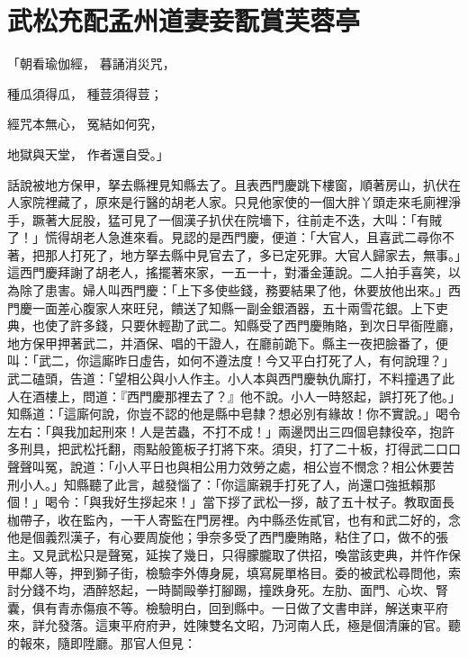 %

\chapter{武松充配孟州道\KG 妻妾翫賞芙蓉亭}

「朝看瑜伽經，  暮誦消災咒，

種瓜須得瓜，  種荳須得荳；

經咒本無心，  冤結如何究，

地獄與天堂，  作者還自受。」

話說被地方保甲，拏去縣裡見知縣去了。且表西門慶跳下樓窗，順著房山，扒伏在人家院裡藏了，原來是行醫的胡老人家。只見他家使的一個大胖丫頭走來毛廁裡淨手，蹶著大屁股，猛可見了一個漢子扒伏在院墻下，往前走不迭，大叫：「有賊了！」慌得胡老人急進來看。見認的是西門慶，便道：「大官人，且喜武二尋你不著，把那人打死了，地方拏去縣中見官去了，多已定死罪。大官人歸家去，無事。」這西門慶拜謝了胡老人，搖擺著來家，一五一十，對潘金蓮說。二人拍手喜笑，以為除了患害。婦人叫西門慶：「上下多使些錢，務要結果了他，休要放他出來。」西門慶一面差心腹家人來旺兒，饋送了知縣一副金銀酒器，五十兩雪花銀。上下吏典，也使了許多錢，只要休輕勘了武二。知縣受了西門慶賄賂，到次日早衙陞廳，地方保甲押著武二，并酒保、唱的干證人，在廳前跪下。縣主一夜把臉番了，便叫：「武二，你這廝昨日虛告，如何不遵法度！今又平白打死了人，有何說理？」武二磕頭，告道：「望相公與小人作主。小人本與西門慶執仇廝打，不料撞遇了此人在酒樓上，問道：『西門慶那裡去了？』他不說。小人一時怒起，誤打死了他。」知縣道：「這廝何說，你豈不認的他是縣中皂隸？想必別有緣故！你不實說。」喝令左右：「與我加起刑來！人是苦蟲，不打不成！」兩邊閃出三四個皂隸役卒，抱許多刑具，把武松托翻，雨點般篦板子打將下來。須臾，打了二十板，打得武二口口聲聲叫冤，說道：「小人平日也與相公用力效勞之處，相公豈不憫念？相公休要苦刑小人。」知縣聽了此言，越發惱了：「你這廝親手打死了人，尚還口強抵賴那個！」喝令：「與我好生拶起來！」當下拶了武松一拶，敲了五十杖子。教取面長枷帶子，收在監內，一干人寄監在門房裡。內中縣丞佐貳官，也有和武二好的，念他是個義烈漢子，有心要周旋他；爭奈多受了西門慶賄賂，粘住了口，做不的張主。又見武松只是聲冤，延挨了幾日，只得朦朧取了供招，喚當該吏典，并忤作保甲鄰人等，押到獅子街，檢驗李外傳身屍，填寫屍單格目。委的被武松尋問他，索討分錢不均，酒醉怒起，一時鬬毆拳打腳踢，撞跌身死。左肋、面門、心坎、腎囊，俱有青赤傷痕不等。檢驗明白，回到縣中。一日做了文書申詳，解送東平府來，詳允發落。這東平府府尹，姓陳雙名文昭，乃河南人氏，極是個清廉的官。聽的報來，隨即陞廳。那官人但見：


